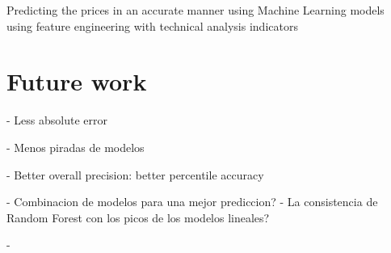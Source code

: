 \documentclass[12pt]{report} %
\begin{document}
Predicting the prices in an accurate manner using Machine Learning models using feature engineering with technical analysis indicators


\section{Future work}
- Less absolute error

- Menos piradas de modelos

- Better overall precision: better percentile accuracy

- Combinacion de modelos para una mejor prediccion? - La consistencia de Random Forest con los picos de los modelos lineales?

- 




\clearpage
{}

\printbibliography




\end{document}
